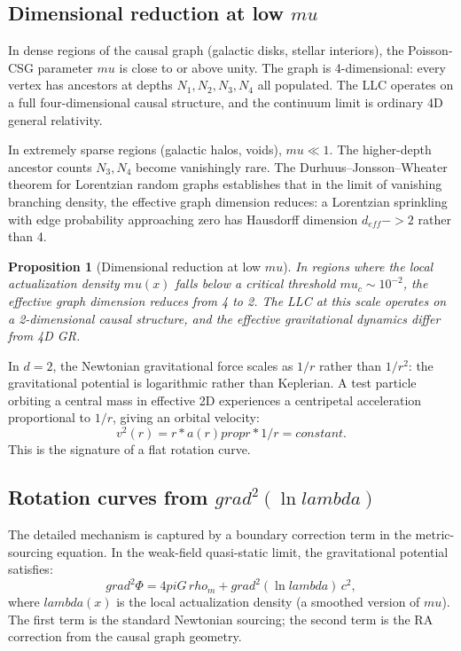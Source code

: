 \documentclass[11pt]{article}
\def\rho{rho}%
\def\mu{mu}%
\def\lambda{lambda}%
\def\pi{pi}%
\def\mathrm#1{#1}%
\def\text#1{#1}%
\def\frac#1#2{#1/#2}%
\def\cdot{*}%
\def\to{->}%
\def\nabla{grad}%
\def\propto{prop}%
\newtheorem{proposition}{Proposition}
\begin{document}
\subsection{Dimensional reduction at low $\mu$}
\label{sec:dim_reduction}

In dense regions of the causal graph (galactic disks, stellar interiors), the Poisson-CSG parameter $\mu$ is close to or above unity. The graph is 4-dimensional: every vertex has ancestors at depths $N_1, N_2, N_3, N_4$ all populated. The LLC operates on a full four-dimensional causal structure, and the continuum limit is ordinary 4D general relativity.

In extremely sparse regions (galactic halos, voids), $\mu \ll 1$. The higher-depth ancestor counts $N_3, N_4$ become vanishingly rare. The Durhuus--Jonsson--Wheater theorem for Lorentzian random graphs establishes that in the limit of vanishing branching density, the effective graph dimension reduces: a Lorentzian sprinkling with edge probability approaching zero has Hausdorff dimension $d_{\mathrm{eff}} \to 2$ rather than 4.

\begin{proposition}[Dimensional reduction at low $\mu$]
\label{prop:dim_reduction}
In regions where the local actualization density $\mu(x)$ falls below a critical threshold $\mu_c \sim 10^{-2}$, the effective graph dimension reduces from 4 to 2. The LLC at this scale operates on a 2-dimensional causal structure, and the effective gravitational dynamics differ from 4D GR.
\end{proposition}

In $d=2$, the Newtonian gravitational force scales as $1/r$ rather than $1/r^2$: the gravitational potential is logarithmic rather than Keplerian. A test particle orbiting a central mass in effective 2D experiences a centripetal acceleration proportional to $1/r$, giving an orbital velocity:
\begin{equation}
v^2(r) = r \cdot a(r) \propto r \cdot \frac{1}{r} = \text{constant}.
\end{equation}
This is the signature of a flat rotation curve.

\subsection{Rotation curves from $\nabla^2(\ln\lambda)$}
\label{sec:rotation_curves}

The detailed mechanism is captured by a boundary correction term in the metric-sourcing equation. In the weak-field quasi-static limit, the gravitational potential satisfies:
\begin{equation}
\label{eq:modified_poisson}
\nabla^2\Phi = 4\pi G\,\rho_m + \nabla^2(\ln\lambda)\,c^2,
\end{equation}
where $\lambda(x)$ is the local actualization density (a smoothed version of $\mu$). The first term is the standard Newtonian sourcing; the second term is the RA correction from the causal graph geometry.
\end{document}
